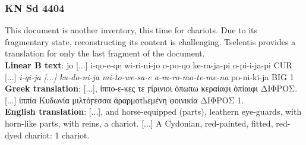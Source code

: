 \subsubsection{KN Sd 4404}
This document is another inventory, this time for chariots.
Due to its fragmentary state, reconstructing its content is challenging.
Tselentis provides a translation for only the last fragment of the document. \\
\textbf{Linear B text}: jo [...] i-qo-e-qe wi-ri-ni-jo o-po-qo ke-ra-ja-pi o-pi-i-ja-pi CUR [...] \textit{i-qi-ja [...] ku-do-ni-ja mi-to-we-sa-e a-ra-ro-mo-te-me-na} po-ni-ki-ja BIG 1 \\
\textbf{Greek translation}: \textgreek{[...], ἱππο-ε-κες τε ϝίρινιοι ὀπωπω κεραίαφι ὀπίαιφι ΔΙΦΡΟΣ. [...] ἱππία Κυδωνία μιλτόϝεσσα ἀραρμοτhεμένη φοινικία ΔΙΦΡΟΣ 1.} \\
\textbf{English translation}: [...], and horse-equipped (parts), leathern eye-guards, with horn-like parts, with reins, a chariot. [...] A Cydonian, red-painted, fitted, red-dyed chariot: 1 chariot.

